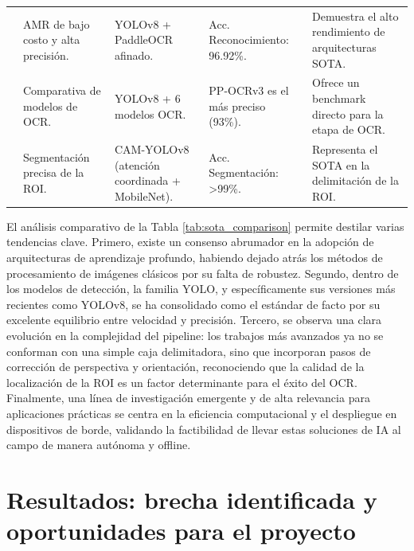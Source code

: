 \begin{table}[H]
\begin{singlespace}
\begin{tabularx}{\textwidth}{
        >{\bfseries}p{2cm} 
        >{\raggedright\arraybackslash}X 
        >{\raggedright\arraybackslash}X 
        >{\raggedright\arraybackslash}X 
        >{\raggedright\arraybackslash}X
    }
        \addlinespace
        \textcite{Khan2024LowCost} & AMR de bajo costo y alta precisión. & YOLOv8 + PaddleOCR afinado. & Acc. Reconocimiento: 96.92\%. & Demuestra el alto rendimiento de arquitecturas SOTA. \\
        \addlinespace
        \textcite{Nguyen2025Water} & Comparativa de modelos de OCR. & YOLOv8 + 6 modelos OCR. & PP-OCRv3 es el más preciso (93\%). & Ofrece un benchmark directo para la etapa de OCR. \\
        \addlinespace
        \textcite{Wang2025} & Segmentación precisa de la ROI. & CAM-YOLOv8 (atención coordinada + MobileNet). & Acc. Segmentación: >99\%. & Representa el SOTA en la delimitación de la ROI. \\
        \bottomrule
    \end{tabularx}
    \end{singlespace}
\end{table}

El análisis comparativo de la Tabla \ref{tab:sota_comparison} permite destilar varias tendencias clave. Primero, existe un consenso abrumador en la adopción de arquitecturas de aprendizaje profundo, habiendo dejado atrás los métodos de procesamiento de imágenes clásicos por su falta de robustez. Segundo, dentro de los modelos de detección, la familia YOLO, y específicamente sus versiones más recientes como YOLOv8, se ha consolidado como el estándar de facto por su excelente equilibrio entre velocidad y precisión. Tercero, se observa una clara evolución en la complejidad del pipeline: los trabajos más avanzados ya no se conforman con una simple caja delimitadora, sino que incorporan pasos de corrección de perspectiva y orientación, reconociendo que la calidad de la localización de la ROI es un factor determinante para el éxito del OCR. Finalmente, una línea de investigación emergente y de alta relevancia para aplicaciones prácticas se centra en la eficiencia computacional y el despliegue en dispositivos de borde, validando la factibilidad de llevar estas soluciones de IA al campo de manera autónoma y offline.

\section{Resultados: brecha identificada y oportunidades para el proyecto}
\label{sec:conclusion_and_gap}

